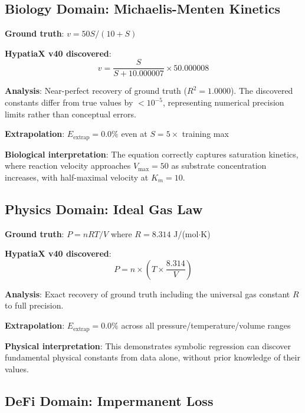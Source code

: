 \subsection{Biology Domain: Michaelis-Menten Kinetics}

\begin{example}
\textbf{Ground truth}: $v = 50S/(10 + S)$

\textbf{HypatiaX v40 discovered}:
\begin{equation}
v = \frac{S}{S + 10.000007} \times 50.000008
\end{equation}

\textbf{Analysis}: Near-perfect recovery of ground truth ($R^2 = 1.0000$). The discovered constants differ from true values by $<10^{-5}$, representing numerical precision limits rather than conceptual errors.

\textbf{Extrapolation}: $E_{\text{extrap}} = 0.0\%$ even at $S = 5\times$ training max

\textbf{Biological interpretation}: The equation correctly captures saturation kinetics, where reaction velocity approaches $V_{\max} = 50$ as substrate concentration increases, with half-maximal velocity at $K_m = 10$.
\end{example}

\subsection{Physics Domain: Ideal Gas Law}

\begin{example}
\textbf{Ground truth}: $P = nRT/V$ where $R = 8.314$ J/(mol$\cdot$K)

\textbf{HypatiaX v40 discovered}:
\begin{equation}
P = n \times \left(T \times \frac{8.314}{V}\right)
\end{equation}

\textbf{Analysis}: Exact recovery of ground truth including the universal gas constant $R$ to full precision.

\textbf{Extrapolation}: $E_{\text{extrap}} = 0.0\%$ across all pressure/temperature/volume ranges

\textbf{Physical interpretation}: This demonstrates symbolic regression can discover fundamental physical constants from data alone, without prior knowledge of their values.
\end{example}

\subsection{DeFi Domain: Impermanent Loss}


